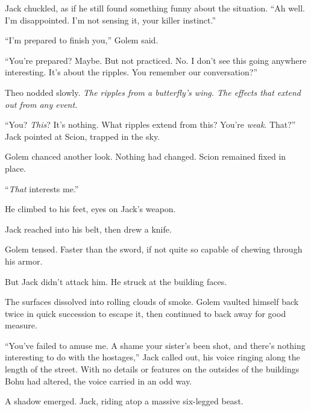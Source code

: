 Jack chuckled, as if he still found something funny about the situation.  ``Ah well.  I'm disappointed.  I'm not sensing it, your killer instinct.''



``I'm prepared to finish you,'' Golem said.



``You're prepared?  Maybe.  But not practiced.  No.  I don't see this going anywhere interesting.  It's about the ripples.  You remember our conversation?''



Theo nodded slowly.  \emph{The ripples from a butterfly's wing.  The effects that extend out from any event. }



``You?  \emph{This}?  It's nothing.  What ripples extend from this?  You're \emph{weak}.  That?'' Jack pointed at Scion, trapped in the sky.



Golem chanced another look.  Nothing had changed.  Scion remained fixed in place.



``\emph{That} interests me.''



He climbed to his feet, eyes on Jack's weapon.



Jack reached into his belt, then drew a knife.



Golem tensed.  Faster than the sword, if not quite so capable of chewing through his armor.



But Jack didn't attack him.  He struck at the building faces.



The surfaces dissolved into rolling clouds of smoke.  Golem vaulted himself back twice in quick succession to escape it, then continued to back away for good measure.



``You've failed to amuse me.  A shame your sister's been shot, and there's nothing interesting to do with the hostages,'' Jack called out, his voice ringing along the length of the street.  With no details or features on the outsides of the buildings Bohu had altered, the voice carried in an odd way.



A shadow emerged.  Jack, riding atop a massive six-legged beast.




